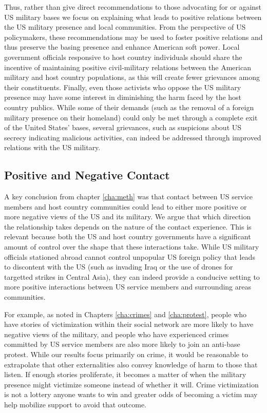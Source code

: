 Thus, rather than give direct recommendations to those advocating for or against US military bases we focus on explaining what leads to positive relations between the US military presence and local communities. From the perspective of US policymakers, these recommendations may be used to foster positive relations and thus preserve the basing presence and enhance American soft power. Local government officials responsive to host country individuals should share the incentive of maintaining positive civil-military relations between the American military and host country populations, as this will create fewer grievances among their constituents. Finally, even those activists who oppose the US military presence may have some interest in diminishing the harm faced by the host country publics. While some of their demands (such as the removal of a foreign military presence on their homeland) could only be met through a complete exit of the United States' bases, several grievances, such as suspicions about US secrecy indicating malicious activities, can indeed be addressed through improved relations with the US military. 




\subsection*{Positive and Negative Contact}

A key conclusion from chapter \ref{cha:meth} was that contact between US service members and host country communities could lead to either more positive or more negative views of the US and its military. We argue that which direction the relationship takes depends on the nature of the contact experience. This is relevant because both the US and host country governments have a significant amount of control over the shape that these interactions take. While US military officials stationed abroad cannot control unpopular US foreign policy that leads to discontent with the US (such as invading Iraq or the use of drones for targetted strikes in Central Asia), they can indeed provide a conducive setting to more positive interactions between US service members and surrounding areas communities. 

For example, as noted in Chapters \ref{cha:crimes} and \ref{cha:protest}, people who have stories of victimization within their social network are more likely to have negative views of the military, and people who have experienced crimes committed by US service members are also more likely to join an anti-base protest.  While our results focus primarily on crime, it would be reasonable to extrapolate that other externalities also convey knowledge of harm to those that listen. If enough stories proliferate, it becomes a matter of when the military presence might victimize someone instead of whether it will. Crime victimization is not a lottery anyone wants to win and greater odds of becoming a victim may help mobilize support to avoid that outcome. 

